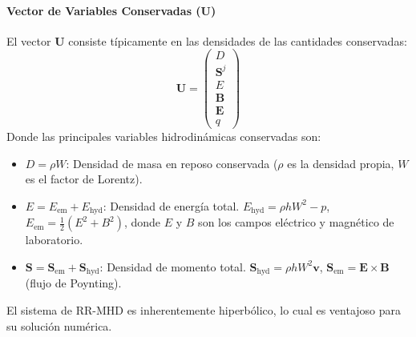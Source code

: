 \paragraph{Vector de Variables Conservadas ($\mathbf{U}$)}
El vector $\mathbf{U}$ consiste típicamente en las densidades de las cantidades conservadas:
$$ \mathbf{U} = \begin{pmatrix} D \\ \mathbf{S}^j \\ E \\ \mathbf{B} \\ \mathbf{E} \\ q \end{pmatrix} $$
Donde las principales variables hidrodinámicas conservadas son:
\begin{itemize}
    \item $D = \rho W$: Densidad de masa en reposo conservada ($\rho$ es la densidad propia, $W$ es el factor de Lorentz).
    \item $E = E_{\text{em}} + E_{\text{hyd}}$: Densidad de energía total. $E_{\text{hyd}} = \rho h W^2 - p$, $E_{\text{em}} = \frac{1}{2}(E^2 + B^2)$, donde $E$ y $B$ son los campos eléctrico y magnético de laboratorio.
    \item $\mathbf{S} = \mathbf{S}_{\text{em}} + \mathbf{S}_{\text{hyd}}$: Densidad de momento total. $\mathbf{S}_{\text{hyd}} = \rho h W^2 \mathbf{v}$, $\mathbf{S}_{\text{em}} = \mathbf{E} \times \mathbf{B}$ (flujo de Poynting).
\end{itemize}
El sistema de RR-MHD es inherentemente hiperbólico, lo cual es ventajoso para su solución numérica.

